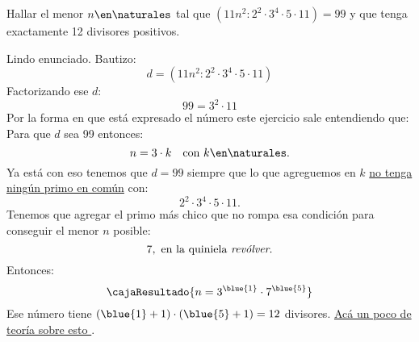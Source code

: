 \begin{enunciado}{\ejExtra}
	Hallar el menor $n \en \naturales$ tal que $(11n^2 : 2^2 \cdot 3^4 \cdot 5 \cdot 11) = 99$ y
	que tenga exactamente 12 divisores positivos.
\end{enunciado}

Lindo enunciado. Bautizo:
$$
	d = (11n^2 : 2^2 \cdot 3^4 \cdot 5 \cdot 11)
$$
Factorizando ese $d$:
$$
	99 = 3^2 \cdot 11
$$
Por la forma en que está expresado el número este ejercicio sale entendiendo que:
Para que $d$ sea 99 entonces:
$$
	n = 3 \cdot k \quad \text{con } k \en \naturales.
$$
Ya está con eso tenemos que $d = 99$ siempre que lo que agreguemos en $k$ \underline{no tenga ningún primo en común} con:
$$
	2^2 \cdot 3^4 \cdot 5 \cdot 11.
$$
Tenemos que agregar el primo más chico que no rompa esa condición para conseguir el menor $n$ posible:
$$
	7,\text{ en la quiniela \textit{revólver}.}
$$
Entonces:
$$
	\cajaResultado{
		n = 3^{\blue{1}} \cdot 7^{\blue{5}}
	}
$$
Ese número tiene $(\blue{1} + 1) \cdot (\blue{5} + 1) = 12$ divisores.
\hyperlink{teoria-4:cantidadDivisores}{Acá un poco de teoría sobre esto \click}.

\begin{aportes}
	\item {}
\end{aportes}
